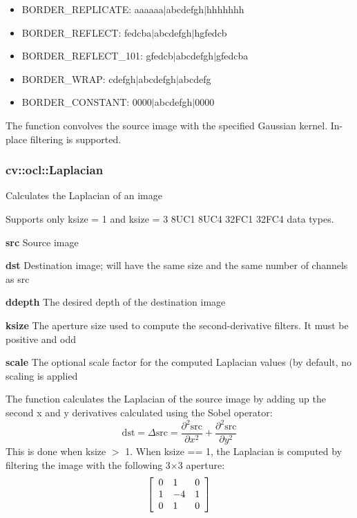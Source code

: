 \documentclass{article}
\begin{document}
\begin{itemize}
\item BORDER{\_}REPLICATE: aaaaaa$\vert $abcdefgh$\vert $hhhhhhh
\item BORDER{\_}REFLECT: fedcba$\vert $abcdefgh$\vert $hgfedcb
\item BORDER{\_}REFLECT{\_}101: gfedcb$\vert $abcdefgh$\vert $gfedcba
\item BORDER{\_}WRAP: cdefgh$\vert $abcdefgh$\vert $abcdefg
\item BORDER{\_}CONSTANT: 0000$\vert $abcdefgh$\vert $0000
\end{itemize}

The function convolves the source image with the specified Gaussian kernel.
In-place filtering is supported.

\newpage

\subsubsection{cv::ocl::Laplacian}
\label{subsubsec:mylabel39}
Calculates the Laplacian of an image

Supports only ksize = 1 and ksize = 3 8UC1 8UC4 32FC1 32FC4 data types.

\textbf{src }Source image

\textbf{dst }Destination image; will have the same size and the same number
of channels as src

\textbf{ddepth }The desired depth of the destination image

\textbf{ksize }The aperture size used to compute the second-derivative
filters. It must be positive and odd

\textbf{scale }The optional scale factor for the computed Laplacian values
(by default, no scaling is applied

The function calculates the Laplacian of the source image by adding up the
second x and y derivatives calculated using the Sobel operator:
\[
\mbox{dst}=\Delta \mbox{src}=\frac{\partial ^2\mbox{src}}{\partial
x^2}+\frac{\partial ^2\mbox{src}}{\partial y^2}
\]
This is done when ksize $>$ 1. When ksize == 1, the Laplacian is computed by
filtering the image with the following 3$\times $3 aperture:
\[
\left[ {{\begin{array}{*{20}c}
 0 \hfill & 1 \hfill & 0 \hfill \\
 1 \hfill & {-4} \hfill & 1 \hfill \\
 0 \hfill & 1 \hfill & 0 \hfill \\
\end{array} }} \right]
\]
\newpage
\end{document}
